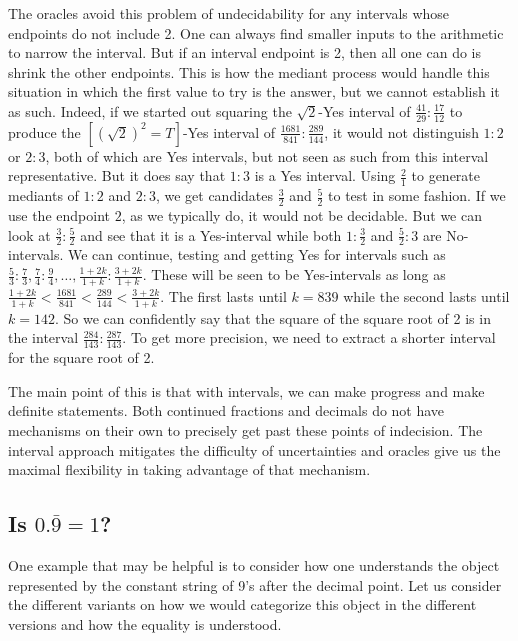 \documentclass[12pt]{article}
\begin{document}
The oracles avoid this problem of undecidability for any intervals whose endpoints do not include 2. One can always find smaller inputs to the arithmetic to narrow the interval. But if an interval endpoint is 2, then all one can do is shrink the other endpoints. This is how the mediant process would handle this situation in which the first value to try is the answer, but we cannot establish it as such. Indeed, if we started out squaring the $\sqrt{2}$-Yes interval of $\frac{41}{29}:\frac{17}{12}$ to produce the $[(\sqrt{2})^2=T]$-Yes interval of $\frac{1681}{841}:\frac{289}{144}$, it would not distinguish $1:2$ or $2:3$, both of which are Yes intervals, but not seen as such from this interval representative. But it does say that $1:3$ is a Yes interval. Using $\frac{2}{1}$ to generate mediants of $1:2$ and $2:3$, we get candidates $\frac{3}{2}$ and $\frac{5}{2}$ to test in some fashion. If we use the endpoint $2$, as we typically do, it would not be decidable. But we can look at $\frac{3}{2}:\frac{5}{2}$ and see that it is a Yes-interval while both $1:\frac{3}{2}$ and $\frac{5}{2}:3$ are No-intervals. We can continue, testing and getting Yes for intervals such as $\frac{5}{3}:\frac{7}{3}, \frac{7}{4}:\frac{9}{4}, \ldots, \frac{1 + 2k}{1+k}:\frac{3+2k}{1+k}$. These will be seen to be Yes-intervals as long as $\frac{1+2k}{1+k} < \frac{1681}{841} < \frac{289}{144} < \frac{3+2k}{1+k}$. The first lasts until $k=839$ while the second lasts until $k=142$. So we can confidently say that the square of the square root of 2 is in the interval $\frac{284}{143}:\frac{287}{143}$. To get more precision, we need to extract a shorter interval for the square root of 2. 

The main point of this is that with intervals, we can make progress and make definite statements. Both continued fractions and decimals do not have mechanisms on their own to precisely get past these points of indecision. The interval approach mitigates the difficulty of uncertainties and oracles give us the maximal flexibility in taking advantage of that mechanism.


\subsection{ Is \texorpdfstring{$0.\bar{9}=1$}{0.9=1}?}

One example that may be helpful is to consider how one understands the object represented by the constant string of 9's after the decimal point. Let us consider the different variants on how we would categorize this object in the different versions and how the equality is understood. 
\end{document}
